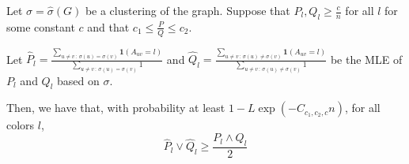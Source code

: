 \documentclass{article}
\begin{document}
\begin{proposition}
\label{prop:prob_estimate_lower_bound}
Let $\sigma = \hat{\sigma}(G)$ be a clustering of the graph. Suppose that $P_l, Q_l \geq \frac{c}{n}$ for all $l$ for some constant $c$ and that $c_1 \leq \frac{P}{Q} \leq c_2$. 

      
Let $\hat{P}_l = \frac{\sum_{u \neq v \,:\, \sigma(u)=\sigma(v)} \mathbf{1}(A_{uv} = l) }
                      {\sum_{u \neq v \,:\, \sigma(u) = \sigma(v)} 1}$ and
    $\hat{Q}_l = \frac{\sum_{u \neq v \,:\, \sigma(u) \neq \sigma(v)} \mathbf{1}(A_{uv} = l) }
                      {\sum_{u \neq v \,:\, \sigma(u) \neq \sigma(v)} 1}$ be the MLE of $P_l$ and $Q_l$ based on $\sigma$. 

Then, we have that, with probability at least $1 - L \exp(- C_{c_1, c_2, c} n)$, for all colors $l$,
\[
\hat{P}_l \vee \hat{Q}_l \geq \frac{ P_l \wedge Q_l}{2}   
\]
\end{proposition}
\end{document}
